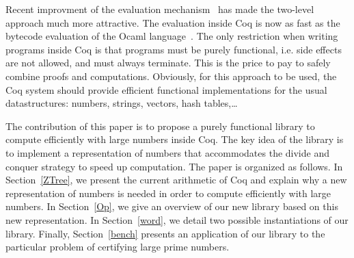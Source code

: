 Recent improvment of the evaluation mechanism~\cite{GreLer} has made the two-level
approach much more attractive.  The evaluation inside Coq is now as fast as the bytecode evaluation of
the {\sc Ocaml} language~\cite{Ocaml}. The only restriction when writing programs
inside {\sc Coq} is that programs must be purely functional, i.e. side effects are not allowed,
and must always terminate. This is the price to pay to safely combine proofs
and computations. Obviously, for this approach to be used, 
the {\sc Coq} system should provide efficient functional implementations for the
usual datastructures: numbers, strings, vectors, hash tables,\dots 

The contribution of this paper is to propose a purely functional library to compute 
efficiently with large numbers inside {\sc Coq}. The key idea of the library is to 
implement a representation of numbers that accommodates the divide and conquer strategy 
to speed up computation. The paper is organized as follows. In Section~\ref{ZTree}, we present 
the current arithmetic of {\sc Coq} and explain why a new representation of numbers is needed
in order to compute efficiently with large numbers. In Section~\ref{Op}, we give an overview of our new library
based on this new representation.  
In Section~\ref{word}, we detail two possible instantiations of our library.
Finally, Section~\ref{bench} presents an application of our library to the particular
problem of certifying large prime numbers.